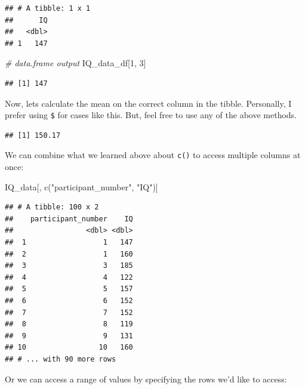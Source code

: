 \documentclass[
]{book}
\newenvironment{Shaded}{\begin{snugshade}}{\end{snugshade}}
\newcommand{\CommentTok}[1]{\textcolor[rgb]{0.56,0.35,0.01}{\textit{#1}}}
\newcommand{\DecValTok}[1]{\textcolor[rgb]{0.00,0.00,0.81}{#1}}
\newcommand{\FunctionTok}[1]{\textcolor[rgb]{0.00,0.00,0.00}{#1}}
\newcommand{\NormalTok}[1]{#1}
\newcommand{\SpecialCharTok}[1]{\textcolor[rgb]{0.00,0.00,0.00}{#1}}
\newcommand{\StringTok}[1]{\textcolor[rgb]{0.31,0.60,0.02}{#1}}
\begin{document}
\begin{verbatim}
## # A tibble: 1 x 1
##      IQ
##   <dbl>
## 1   147
\end{verbatim}

\begin{Shaded}
\begin{Highlighting}[]
\CommentTok{\# data.frame output}
\NormalTok{IQ\_data\_df[}\DecValTok{1}\NormalTok{, }\DecValTok{3}\NormalTok{]}
\end{Highlighting}
\end{Shaded}

\begin{verbatim}
## [1] 147
\end{verbatim}

Now, lets calculate the mean on the correct column in the tibble. Personally, I prefer using \texttt{\$} for cases like this. But, feel free to use any of the above methods.

\begin{Shaded}
\end{Shaded}

\begin{verbatim}
## [1] 150.17
\end{verbatim}

We can combine what we learned above about \texttt{c()} to access multiple columns at once:

\begin{Shaded}
\begin{Highlighting}[]
\NormalTok{IQ\_data[, }\FunctionTok{c}\NormalTok{(}\StringTok{"participant\_number"}\NormalTok{, }\StringTok{"IQ"}\NormalTok{)]}
\end{Highlighting}
\end{Shaded}

\begin{verbatim}
## # A tibble: 100 x 2
##    participant_number    IQ
##                 <dbl> <dbl>
##  1                  1   147
##  2                  1   160
##  3                  3   185
##  4                  4   122
##  5                  5   157
##  6                  6   152
##  7                  7   152
##  8                  8   119
##  9                  9   131
## 10                 10   160
## # ... with 90 more rows
\end{verbatim}

Or we can access a range of values by specifying the rows we'd like to access:
\end{document}
